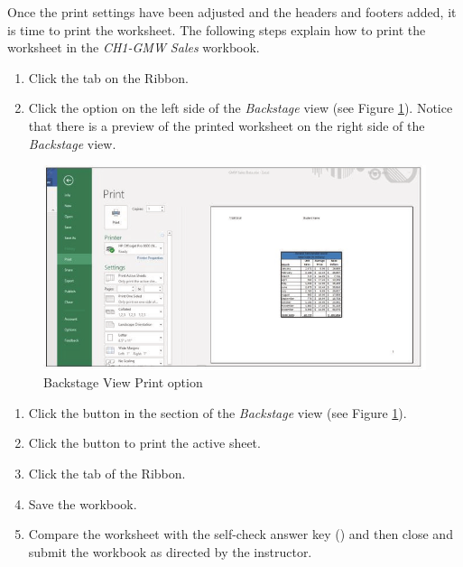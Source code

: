 Once the print settings have been adjusted and the headers and footers added, it is time to print the worksheet. The following steps explain how to print the worksheet in the \textit{CH1-GMW Sales} workbook.

\begin{enumerate}
	\item Click the  tab on the Ribbon.
	\item Click the  option on the left side of the \textit{Backstage} view (see Figure \ref{01:fig52}). Notice that there is a preview of the printed worksheet on the right side of the \textit{Backstage} view.
\end{enumerate}

\begin{figure}[H]
	\centering
	\includegraphics[width=\maxwidth{.95\linewidth}]{gfx/ch01_fig52}
	\caption{Backstage View Print option}
	\label{01:fig52}
\end{figure}

\begin{enumerate}[resume]
	\item Click the  button in the  section of the \textit{Backstage} view (see Figure \ref{01:fig52}).
	\item Click the  button to print the active sheet.
	\item Click the  tab of the Ribbon.
	\item Save the  workbook.
	\item Compare the worksheet with the self-check answer key () and then close and submit the  workbook as directed by the instructor.
\end{enumerate}

